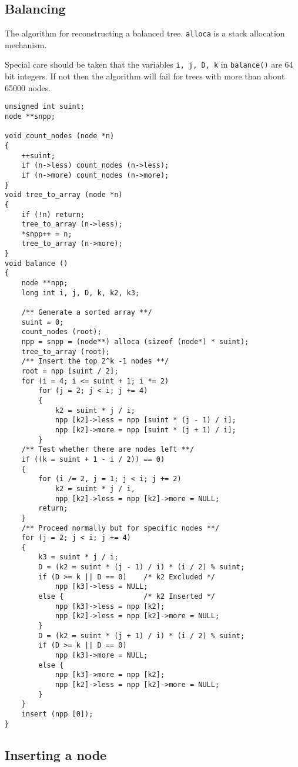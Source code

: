 \documentclass[twocolumn]{article}
\begin{document}
\subsection{Balancing}
\label{code:balance}

The algorithm for reconstructing a balanced tree.
{\tt alloca} is a stack allocation mechanism.

Special care should be taken that the variables {\tt i, j, D, k} in
{\tt balance()} are 64 bit integers. If not then the algorithm will fail for
trees with more than about 65000 nodes.

\begin{verbatim}
unsigned int suint;
node **snpp;

void count_nodes (node *n)
{
    ++suint;
    if (n->less) count_nodes (n->less);
    if (n->more) count_nodes (n->more);
}
void tree_to_array (node *n)
{
    if (!n) return;
    tree_to_array (n->less);
    *snpp++ = n;
    tree_to_array (n->more);
}
void balance ()
{
    node **npp;
    long int i, j, D, k, k2, k3;

    /** Generate a sorted array **/
    suint = 0;
    count_nodes (root);
    npp = snpp = (node**) alloca (sizeof (node*) * suint);
    tree_to_array (root);
    /** Insert the top 2^k -1 nodes **/
    root = npp [suint / 2];
    for (i = 4; i <= suint + 1; i *= 2)
        for (j = 2; j < i; j += 4)
        {
            k2 = suint * j / i;
            npp [k2]->less = npp [suint * (j - 1) / i];
            npp [k2]->more = npp [suint * (j + 1) / i];
        }
    /** Test whether there are nodes left **/
    if ((k = suint + 1 - i / 2)) == 0)
    {
        for (i /= 2, j = 1; j < i; j += 2)
            k2 = suint * j / i,
            npp [k2]->less = npp [k2]->more = NULL;
        return;
    }
    /** Proceed normally but for specific nodes **/
    for (j = 2; j < i; j += 4)
    {
        k3 = suint * j / i;
        D = (k2 = suint * (j - 1) / i) * (i / 2) % suint;
        if (D >= k || D == 0)    /* k2 Excluded */
            npp [k3]->less = NULL;
        else {                   /* k2 Inserted */
            npp [k3]->less = npp [k2];
            npp [k2]->less = npp [k2]->more = NULL;
        }
        D = (k2 = suint * (j + 1) / i) * (i / 2) % suint;
        if (D >= k || D == 0)
            npp [k3]->more = NULL;
        else {
            npp [k3]->more = npp [k2];
            npp [k2]->less = npp [k2]->more = NULL;
        }
    }
    insert (npp [0]);
}
\end{verbatim}

\subsection{Inserting a node}
\end{document}
